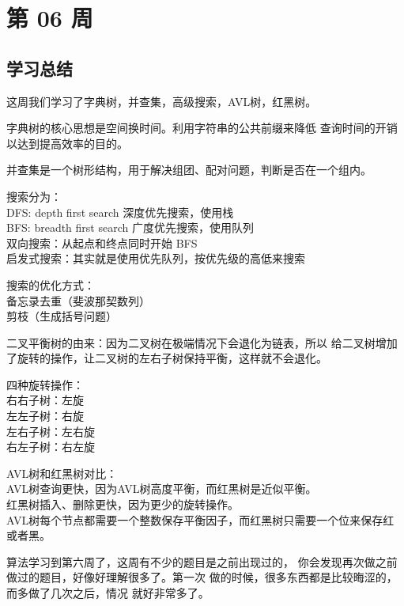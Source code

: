 \newpage
\section{第 06 周}





\subsection{学习总结}

这周我们学习了字典树，并查集，高级搜索，AVL树，红黑树。

字典树的核心思想是空间换时间。利用字符串的公共前缀来降低
查询时间的开销以达到提高效率的目的。

并查集是一个树形结构，用于解决组团、配对问题，判断是否在一个组内。

搜索分为： \\
DFS: depth first search 深度优先搜索，使用栈 \\
BFS: breadth first search 广度优先搜索，使用队列 \\
双向搜索：从起点和终点同时开始 BFS \\
启发式搜索：其实就是使用优先队列，按优先级的高低来搜索

搜索的优化方式： \\
备忘录去重（斐波那契数列） \\
剪枝（生成括号问题）

二叉平衡树的由来：因为二叉树在极端情况下会退化为链表，所以
给二叉树增加了旋转的操作，让二叉树的左右子树保持平衡，这样就不会退化。

四种旋转操作： \\
右右子树：左旋 \\
左左子树：右旋 \\
左右子树：左右旋 \\
右左子树：右左旋

AVL树和红黑树对比： \\
AVL树查询更快，因为AVL树高度平衡，而红黑树是近似平衡。 \\
红黑树插入、删除更快，因为更少的旋转操作。 \\
AVL树每个节点都需要一个整数保存平衡因子，而红黑树只需要一个位来保存红或者黑。

算法学习到第六周了，这周有不少的题目是之前出现过的，
你会发现再次做之前做过的题目，好像好理解很多了。第一次
做的时候，很多东西都是比较晦涩的，而多做了几次之后，情况
就好非常多了。

